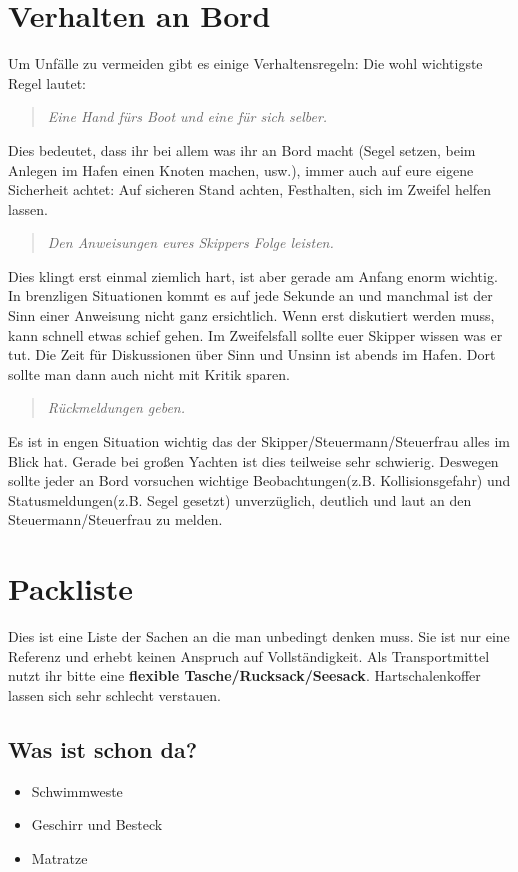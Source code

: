 \documentclass[12pt]{article}
\begin{document}
\section{Verhalten an Bord}
Um Unfälle zu vermeiden gibt es einige Verhaltensregeln: Die wohl
wichtigste Regel lautet:
\begin{quote}
\textit{Eine Hand fürs Boot und eine für sich selber.}
\end{quote}
Dies bedeutet, dass ihr bei allem was ihr an Bord macht (Segel setzen,
beim Anlegen im Hafen einen Knoten machen, usw.), immer auch auf eure
eigene Sicherheit achtet: Auf sicheren Stand achten, Festhalten, sich im Zweifel helfen lassen.
\begin{quote}
\textit{Den Anweisungen eures Skippers Folge leisten.}
\end{quote}
Dies klingt erst einmal ziemlich hart, ist aber gerade am Anfang enorm wichtig.
In brenzligen Situationen kommt es auf jede Sekunde an und
manchmal ist der Sinn einer Anweisung nicht ganz ersichtlich. Wenn erst diskutiert werden muss, kann schnell etwas schief gehen. Im Zweifelsfall sollte euer Skipper wissen was er tut. Die Zeit für Diskussionen über Sinn und Unsinn ist abends im Hafen. Dort sollte man dann auch nicht mit Kritik sparen.

\begin{quote}
\textit{Rückmeldungen geben.}
\end{quote}
Es ist in engen Situation wichtig das der Skipper/Steuermann/Steuerfrau alles im Blick hat. Gerade bei großen Yachten ist dies teilweise sehr schwierig. Deswegen sollte jeder an Bord vorsuchen wichtige Beobachtungen(z.B. Kollisionsgefahr) und Statusmeldungen(z.B. Segel gesetzt) unverzüglich, deutlich und laut an den Steuermann/Steuerfrau zu melden.

\section{Packliste}
Dies ist eine Liste der Sachen an die man unbedingt denken muss. Sie ist nur eine Referenz und erhebt keinen Anspruch auf Vollständigkeit. Als Transportmittel nutzt ihr bitte eine \textbf{flexible Tasche/Rucksack/Seesack}. Hartschalenkoffer lassen sich sehr schlecht verstauen.

\subsection*{Was ist schon da?}
\begin{itemize}
\renewcommand{\labelitemi}{$\boxempty$}
\item Schwimmweste
\item Geschirr und Besteck
\item Matratze
\end{itemize}
\end{document}
